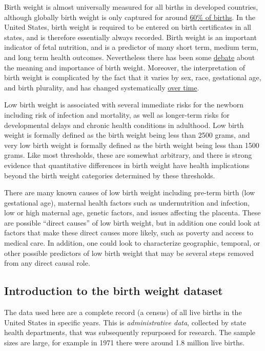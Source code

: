 Birth weight is almost universally measured for all births in developed countries, although globally birth weight is only captured for around \href{https://pubmed.ncbi.nlm.nih.gov/33557859}{60\% of births}.  In the United States, birth weight is required to be entered on birth certificates in all states, and is therefore essentially always recorded.  Birth weight is an important indicator of fetal nutrition, and is a predictor of many short term, medium term, and long term health outcomes.  Nevertheless there has been some \href{https://pubmed.ncbi.nlm.nih.gov/11821313}{debate} about the meaning and importance of birth weight.  Moreover, the interpretation of birth weight is complicated by the fact that it varies by sex, race, gestational age, and birth plurality, and has changed systematically \href{https://www.ajog.org/article/S0002-9378(24)00431-9/fulltext}{over time}.

Low birth weight is associated with several immediate risks for the newborn including risk of infection and mortality, as well as longer-term risks for developmental delays and chronic health conditions in adulthood. Low birth weight is formally defined as the birth weight being less than 2500 grams, and very low birth weight is formally defined as the birth weight being less than 1500 grams.  Like most thresholds, these are somewhat arbitrary, and there is strong evidence that quantitative differences in birth weight have health implications beyond the birth weight categories determined by these thresholds.

There are many known causes of low birth weight including pre-term birth (low gestational age), maternal health factors such as undernutrition and infection, low or high maternal age, genetic factors, and issues affecting the placenta.  These are possible ``direct causes'' of low birth weight, but in addition one could look at factors that make these direct causes more likely, such as poverty and access to medical care.  In addition, one could look to characterize geographic, temporal, or other possible predictors of low birth weight that may be several steps removed from any direct causal role.

\subsection{Introduction to the birth weight dataset}

The data used here are a complete record (a census) of all live births in the United States in specific years.  This is {\em administrative data}, collected by state health departments, that was subsequently repurposed for research.  The sample sizes are large, for example in 1971 there were around 1.8 million live births.


